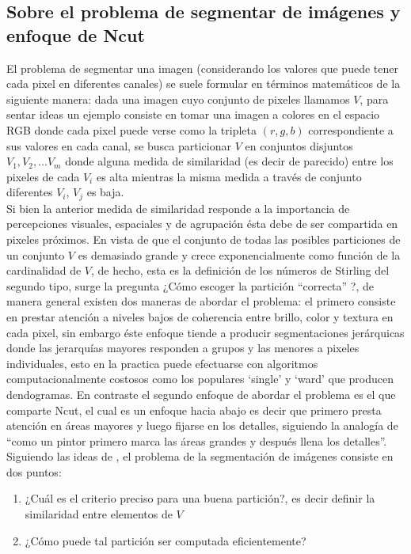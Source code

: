 \documentclass[conference]{IEEEtran}
\begin{document}
\subsection{Sobre el problema de segmentar de imágenes y enfoque de Ncut}
El problema de segmentar una imagen (considerando los valores que puede tener cada pixel en diferentes canales) se suele formular en términos matemáticos de la siguiente manera: dada una imagen cuyo conjunto de pixeles llamamos $V$, para sentar ideas un ejemplo consiste en tomar una imagen a colores en el espacio RGB donde cada pixel puede verse como la tripleta $(r,g,b)$ correspondiente a sus valores en cada canal, se busca particionar $V$ en conjuntos disjuntos $V_1,V_2,…V_m$ donde alguna medida de similaridad (es decir de parecido) entre los pixeles de cada $V_i$ es alta mientras la misma medida a través de conjunto diferentes $V_i$, $V_j$ es baja.\\
Si bien la anterior medida de similaridad responde a la importancia de percepciones visuales, espaciales y de agrupación ésta debe de ser compartida en pixeles próximos. En vista de que el conjunto de todas las posibles particiones de un conjunto $V$ es demasiado grande y crece exponencialmente como función de la cardinalidad de $V$, de hecho, esta es la definición de los números de Stirling del segundo tipo, surge la pregunta ¿Cómo escoger la partición “correcta” ?, de manera general existen dos maneras de abordar el problema: el primero consiste en prestar atención a niveles bajos de coherencia entre brillo, color y textura en cada pixel, sin embargo éste enfoque tiende a producir segmentaciones jerárquicas donde las jerarquías mayores responden a grupos y las menores a pixeles individuales, esto en la practica puede efectuarse con algoritmos computacionalmente costosos como los populares ‘single’ y ‘ward’ que producen dendogramas. En contraste el segundo enfoque de abordar el problema es el que comparte Ncut, el cual es un enfoque hacia abajo es decir que primero presta atención en áreas mayores y luego fijarse en los detalles, siguiendo la analogía de \cite{Ncut} “como un pintor primero marca las áreas grandes y después llena los detalles”.\\
Siguiendo las ideas de \cite{Ncut}, el problema de la segmentación de imágenes consiste en dos puntos: 
\begin{enumerate}
\item ¿Cuál es el criterio preciso para una buena partición?, es decir definir la similaridad entre elementos de $V$ 
\item ¿Cómo puede tal partición ser computada eficientemente?
\end{enumerate}  
\end{document}
